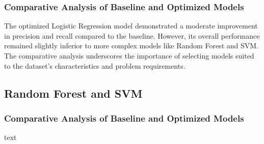         \subsubsection{Comparative Analysis of Baseline and Optimized Models \\}

            The optimized Logistic Regression model demonstrated a moderate improvement in precision and recall compared to the baseline. However, its overall performance remained slightly inferior to more complex models like Random Forest and SVM. The comparative analysis underscores the importance of selecting models suited to the dataset's characteristics and problem requirements.
    
    \subsection{Random Forest and SVM}
    
        \subsubsection{Comparative Analysis of Baseline and Optimized Models \\}
        
            text %
        
